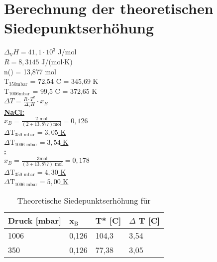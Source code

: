 \section*{Berechnung der theoretischen Siedepunktserhöhung}
	$\Delta _V H = 41,1 \cdot 10^3$ J/mol \\
	$R = 8,3145$ J/(mol$\cdot$K) \\
	\newline
	n() = 13,877 mol \\
	T$_{350\text{mbar}}$ = 72,54 C = 345,69 K \\
	T$_{1006\text{mbar}}$ = 99,5 C = 372,65 K \\
	\newline
	$\Delta T = \frac{R \cdot T^2}{\Delta _{V}H} \cdot x_{B}$ \\
	\newline
	\newline
	\underline{\textbf{NaCl:}} \\
	\newline
	$x_B = \frac{2 \textrm{ mol}}{(2 + 13,877)\textrm{mol}} = 0,126$\\
	\newline
	\underline{\underline{$\Delta \text{T}_{350 \text{ mbar}} = 3,05$ K}} \\ 
	\newline
	\underline{\underline{$\Delta \text{T}_{1006 \text{ mbar}} = 3,54$ K}} \\
	\newline
	\newline
	\underline{\textbf{:}} \\
	\newline
	$x_B = \frac{3 \textrm{mol}}{(3 + 13,877)\textrm{ mol}} = 0,178$\\
	\newline
	\underline{\underline{$\Delta \text{T}_{350 \text{ mbar}} = 4,30$ K}} \\ 
	\newline
	\underline{\underline{$\Delta \text{T}_{1006 \text{ mbar}} = 5,00$ K}} \\	

	\begin{table}[H]
		\centering
		\label{tab:Siedepunkt_NaCl}
			\begin{tabular}{|l|l|l|l|}
			\hline
			\textbf{Druck [mbar]}	&	\textbf{x$_\text{B}$}	&	\textbf{T* [C]} & \textbf{$\Delta$ T [C]} \\\hline
			1006	&	0,126	&	104,3	&	3,54 \\
			350		&	0,126	&	77,38	&	3,05 \\\hline
			\end{tabular}
			\caption{Theoretische Siedepunktserhöhung für }
	\end{table} 
	
